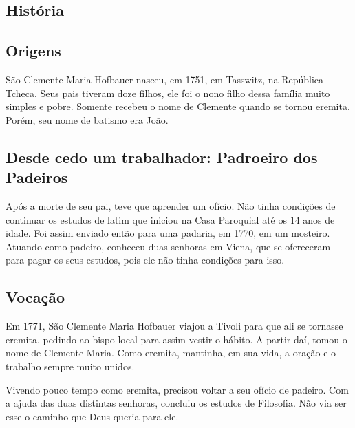 \documentclass[18pt]{article}
\begin{document}
\begin{justify}
 \section{História}

\begin{justify}
 \subsection{Origens}
\end{justify}
São Clemente Maria Hofbauer nasceu, em 1751, em Tasswitz, na República Tcheca. Seus pais tiveram doze filhos, ele foi o nono filho dessa família muito simples e pobre. Somente recebeu o nome de Clemente quando se tornou eremita. Porém, seu nome de batismo era João.



\begin{justify}
 \subsection{Desde cedo um trabalhador: Padroeiro dos Padeiros}
\end{justify}
Após a morte de seu pai, teve que aprender um ofício. Não tinha condições de continuar os estudos de latim que iniciou na Casa Paroquial até os 14 anos de idade. Foi assim enviado então para uma padaria, em 1770, em um mosteiro. Atuando como padeiro, conheceu duas senhoras em Viena, que se ofereceram para pagar os seus estudos, pois ele não tinha condições para isso.


\vspace{.4cm}
\begin{justify}
 \subsection{Vocação}
\end{justify}

Em 1771, São Clemente Maria Hofbauer viajou a Tivoli para que ali se tornasse eremita, pedindo ao bispo local para assim vestir o hábito. A partir daí, tomou o nome de Clemente Maria. Como eremita, mantinha, em sua vida, a oração e o trabalho sempre muito unidos.

Vivendo pouco tempo como eremita, precisou voltar a seu ofício de padeiro. Com a ajuda das duas distintas senhoras, concluiu os estudos de Filosofia. Não via ser esse o caminho que Deus queria para ele.


\end{justify}
\end{document}

